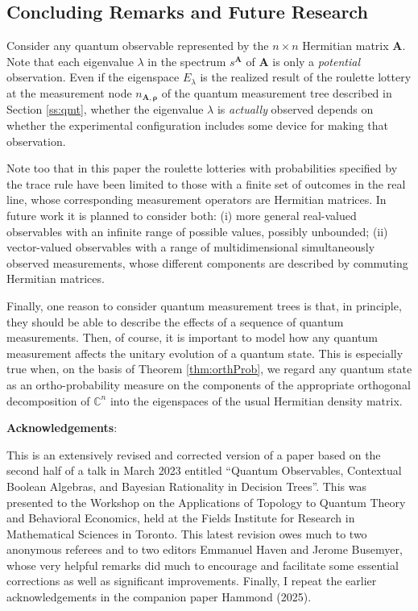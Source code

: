 \documentclass[11pt]{article}
\newcommand \C { \mathbb{C} }
\begin{document}
\subsection{Concluding Remarks and Future Research}

Consider any quantum observable represented by the $n \times n$ Hermitian matrix $ \mathbf A$. 
Note that each eigenvalue $ \lambda $ in the spectrum $ s^\mathbf A$ of $ \mathbf A$
is only a \emph{potential} observation.
Even if the eigenspace $ E_\lambda $ is the realized result of the roulette lottery
at the measurement node $ n_{ \mathbf A, \boldsymbol \rho }$ 
of the quantum measurement tree described in Section \ref{ss:qmt},
whether the eigenvalue $ \lambda $ is \emph{actually} observed depends 
on whether the experimental configuration includes some device for making that observation.

Note too that in this paper the roulette lotteries 
with probabilities specified by the trace rule have been limited to those
with a finite set of outcomes in the real line,
whose corresponding measurement operators are Hermitian matrices.
In future work it is planned to consider both:
(i) more general real-valued observables 
with an infinite range of possible values, possibly unbounded;
(ii) vector-valued observables 
with a range of multidimensional simultaneously observed measurements, 
whose different components are described by commuting Hermitian matrices.

Finally, one reason to consider quantum measurement trees is that, in principle, 
they should be able to describe the effects of a sequence of quantum measurements.
Then, of course, it is important to model how any quantum measurement affects
the unitary evolution of a quantum state.
This is especially true when, on the basis of Theorem \ref{thm:orthProb},
we regard any quantum state as an ortho-probability measure 
on the components of the appropriate orthogonal decomposition of $ \C^n $
into the eigenspaces of the usual Hermitian density matrix.

\medskip
\begin{center}
\textbf{Acknowledgements}:
\end{center}\noindent
This is an extensively revised and corrected version
of a paper based on the second half of a talk in March 2023 entitled
``Quantum Observables, Contextual Boolean Algebras, 
and Bayesian Rationality in Decision Trees''.
This was presented to the Workshop 
on the Applications of Topology to Quantum Theory and Behavioral Economics,
held at the Fields Institute for Research in Mathematical Sciences in Toronto.
This latest revision owes much to two anonymous referees 
and to two editors Emmanuel Haven and Jerome Busemyer, 
whose very helpful remarks did much to encourage and facilitate 
some essential corrections as well as significant improvements.
Finally, I repeat the earlier acknowledgements in the companion paper Hammond (2025).
\end{document}

